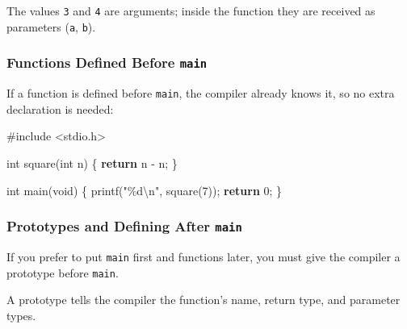 \documentclass[
  letterpaper,
  DIV=11,
  numbers=noendperiod]{scrreprt}
\newenvironment{Shaded}{\begin{snugshade}}{\end{snugshade}}
\newcommand{\ControlFlowTok}[1]{\textcolor[rgb]{0.00,0.23,0.31}{\textbf{#1}}}
\newcommand{\DataTypeTok}[1]{\textcolor[rgb]{0.68,0.00,0.00}{#1}}
\newcommand{\DecValTok}[1]{\textcolor[rgb]{0.68,0.00,0.00}{#1}}
\newcommand{\ImportTok}[1]{\textcolor[rgb]{0.00,0.46,0.62}{#1}}
\newcommand{\NormalTok}[1]{\textcolor[rgb]{0.00,0.23,0.31}{#1}}
\newcommand{\OperatorTok}[1]{\textcolor[rgb]{0.37,0.37,0.37}{#1}}
\newcommand{\PreprocessorTok}[1]{\textcolor[rgb]{0.68,0.00,0.00}{#1}}
\newcommand{\SpecialCharTok}[1]{\textcolor[rgb]{0.37,0.37,0.37}{#1}}
\newcommand{\StringTok}[1]{\textcolor[rgb]{0.13,0.47,0.30}{#1}}
\begin{document}
The values \texttt{3} and \texttt{4} are arguments; inside the function
they are received as parameters (\texttt{a}, \texttt{b}).

\subsubsection{\texorpdfstring{Functions Defined Before
\texttt{main}}{Functions Defined Before main}}\label{functions-defined-before-main}

If a function is defined before \texttt{main}, the compiler already
knows it, so no extra declaration is needed:

\begin{Shaded}
\begin{Highlighting}[]
\PreprocessorTok{\#include }\ImportTok{\textless{}stdio.h\textgreater{}}

\DataTypeTok{int}\NormalTok{ square}\OperatorTok{(}\DataTypeTok{int}\NormalTok{ n}\OperatorTok{)} \OperatorTok{\{}
    \ControlFlowTok{return}\NormalTok{ n }\OperatorTok{{-}}\NormalTok{ n}\OperatorTok{;}
\OperatorTok{\}}

\DataTypeTok{int}\NormalTok{ main}\OperatorTok{(}\DataTypeTok{void}\OperatorTok{)} \OperatorTok{\{}
\NormalTok{    printf}\OperatorTok{(}\StringTok{"}\SpecialCharTok{\%d\textbackslash{}n}\StringTok{"}\OperatorTok{,}\NormalTok{ square}\OperatorTok{(}\DecValTok{7}\OperatorTok{));}
    \ControlFlowTok{return} \DecValTok{0}\OperatorTok{;}
\OperatorTok{\}}
\end{Highlighting}
\end{Shaded}

\subsubsection{\texorpdfstring{Prototypes and Defining After
\texttt{main}}{Prototypes and Defining After main}}\label{prototypes-and-defining-after-main}

If you prefer to put \texttt{main} first and functions later, you must
give the compiler a prototype before \texttt{main}.

A prototype tells the compiler the function's name, return type, and
parameter types.
\end{document}
